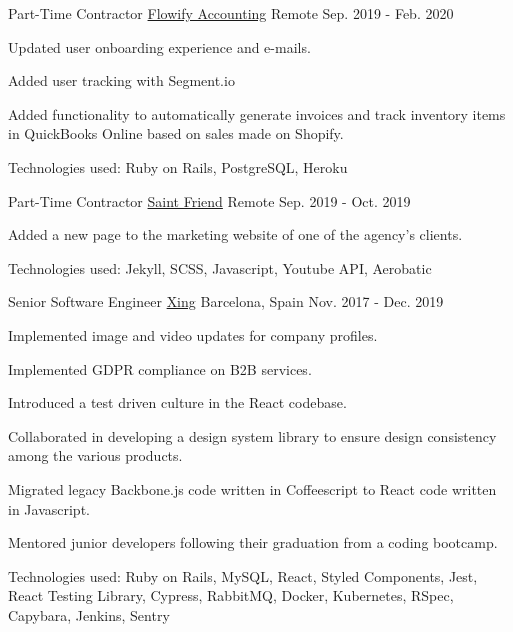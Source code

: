 \documentclass[11pt, a4paper]{awesome-cv}
\begin{document}
\begin{cventries}
  \cventry
    {Part-Time Contractor} %
    {\href{https://flowifyaccounting.com/}{Flowify Accounting}} %
    {Remote} %
    {Sep. 2019 - Feb. 2020} %
    {
      \begin{cvitems} %
        \item {Updated user onboarding experience and e-mails.}
        \item {Added user tracking with Segment.io}
        \item {Added functionality to automatically generate invoices and track inventory items in QuickBooks Online based on sales made on Shopify.}
        \item {Technologies used: Ruby on Rails, PostgreSQL, Heroku}
      \end{cvitems}
    }

  \cventry
    {Part-Time Contractor} %
    {\href{https://www.saintfriend.co/}{Saint Friend}} %
    {Remote} %
    {Sep. 2019 - Oct. 2019} %
    {
      \begin{cvitems} %
        \item {Added a new page to the marketing website of one of the agency's clients.}
        \item {Technologies used: Jekyll, SCSS, Javascript, Youtube API, Aerobatic}
      \end{cvitems}
    }

  \cventry
    {Senior Software Engineer} %
    {\href{https://www.xing.com/}{Xing}} %
    {Barcelona, Spain} %
    {Nov. 2017 - Dec. 2019} %
    {
      \begin{cvitems} %
        \item {Implemented image and video updates for company profiles.}
        \item {Implemented GDPR compliance on B2B services.}
        \item {Introduced a test driven culture in the React codebase.}
        \item {Collaborated in developing a design system library to ensure design consistency among the various products.}
        \item {Migrated legacy Backbone.js code written in Coffeescript to React code written in Javascript.}
        \item {Mentored junior developers following their graduation from a coding bootcamp.}
        \item {Technologies used: Ruby on Rails, MySQL, React, Styled Components, Jest, React Testing Library, Cypress, RabbitMQ, Docker, Kubernetes, RSpec, Capybara, Jenkins, Sentry}
      \end{cvitems}
    }


\end{cventries}
\end{document}
